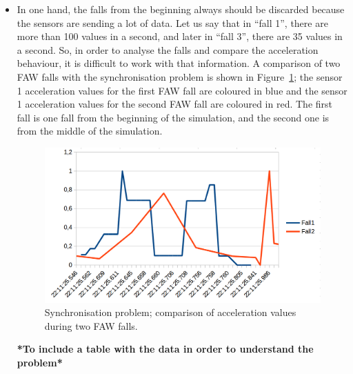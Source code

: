 \documentclass[conference]{IEEEtran}
\theoremstyle{definition}
\begin{document}
\begin{itemize}
 \item In one hand, the falls from the beginning always should be discarded because the sensors are sending a lot of data. 
 Let us say that in ``fall 1'', there are more than 100 values in a second, and later in ``fall 3'', there are 
 35 values in a second. So, in order to analyse the falls and compare the acceleration behaviour, it is 
 difficult to work with that information. A comparison of two FAW falls with the synchronisation problem is shown
 in Figure~\ref{fig:synchronisation1}; the sensor 1 acceleration values for the first FAW fall are coloured in blue and the
 sensor 1 acceleration values for the second FAW fall are coloured in red. The first fall is one fall from the beginning
 of the simulation, and the second one is from the middle of the simulation.
 \begin{figure}[!h]
  \centering
  \includegraphics[scale=0.2]{img/synchronisation1.png}
  \caption[Comparison acceleration during two FAW falls]{Synchronisation problem; comparison of acceleration values during two FAW falls.}
  \label{fig:synchronisation1}
 \end{figure}
 
 \textbf{*To include a table with the data in order to understand the problem*}
 

\end{itemize}
\end{document}
